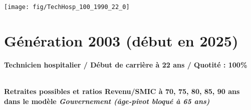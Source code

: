  \vspace{0.1cm} 

 {\hspace{-2.2cm}\texttt{[image: fig/TechHosp\_100\_1990\_22\_0]}} 

\newpage 
 
\section{Génération 2003 (début en 2025)\label{TechHosp_100_2003_22_0}} 
 
{\bf \noindent Technicien hospitalier / Début de carrière à 22 ans / Quotité : 100\%}  ~ 

 ~\\{\bf \noindent Retraites possibles et ratios Revenu/SMIC à 70, 75, 80, 85, 90 ans dans le modèle \emph{Gouvernement (âge-pivot bloqué à 65 ans)}}  
 
